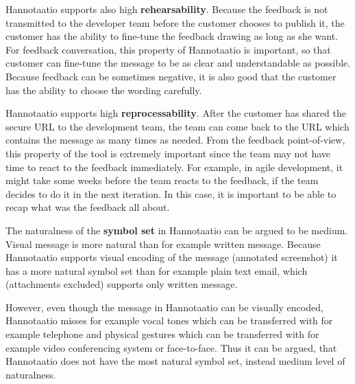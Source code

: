 \documentclass[english,12pt,a4paper,pdftex]{article}
\begin{document}
Hannotaatio supports also high \textbf{rehearsability}. Because the feedback is not transmitted to the developer team before the customer chooses to publish it, the customer has the ability to fine-tune the feedback drawing as long as she want. For feedback conversation, this property of Hannotaatio is important, so that customer can fine-tune the message to be as clear and understandable as possible. Because feedback can be sometimes negative, it is also good that the customer has the ability to choose the wording carefully.

Hannotaatio supports high \textbf{reprocessability}. After the customer has shared the secure \ac{URL} to the development team, the team can come back to the \ac{URL} which contains the message as many times as needed. From the feedback point-of-view, this property of the tool is extremely important since the team may not have time to react to the feedback immediately. For example, in agile development, it might take some weeks before the team reacts to the feedback, if the team decides to do it in the next iteration. In this case, it is important to be able to recap what was the feedback all about.

The naturalness of the \textbf{symbol set} in Hannotaatio can be argued to be medium. Visual message is more natural than for example written message. Because Hannotaatio supports visual encoding of the message (annotated screenshot) it has a more natural symbol set than for example plain text email, which (attachments excluded) supports only written message.

However, even though the message in Hannotaatio can be visually encoded, Hannotaatio misses for example vocal tones which can be transferred with for example telephone and physical gestures which can be transferred with for example video conferencing system or face-to-face. Thus it can be argued, that Hannotaatio does not have the most natural symbol set, instead medium level of naturalness.
\end{document}
